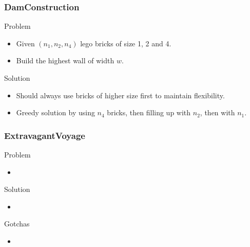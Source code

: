 \documentclass{beamer}
\begin{document}
\begin{frame}
    \frametitle{DamConstruction}
    \begin{block}{Problem}
        \begin{itemize}
            \item Given $(n_1, n_2, n_4)$ lego bricks of size 1, 2 and 4.
            \item Build the highest wall of width $w$.
        \end{itemize}
    \end{block}
    \begin{block}{Solution}
        \begin{itemize}
            \item Should always use bricks of higher size first to maintain flexibility.
            \item Greedy solution by using $n_4$ bricks, then filling up with $n_2$, then with $n_1$.
        \end{itemize}
    \end{block}
\end{frame}

\begin{frame}
    \frametitle{ExtravagantVoyage}
    \begin{block}{Problem}
        \begin{itemize}
            \item 
        \end{itemize}
    \end{block}
    \begin{block}{Solution}
        \begin{itemize}
            \item 
        \end{itemize}
    \end{block}
    \begin{block}{Gotchas}
        \begin{itemize}
            \item 
        \end{itemize}
    \end{block}
\end{frame}
\end{document}
